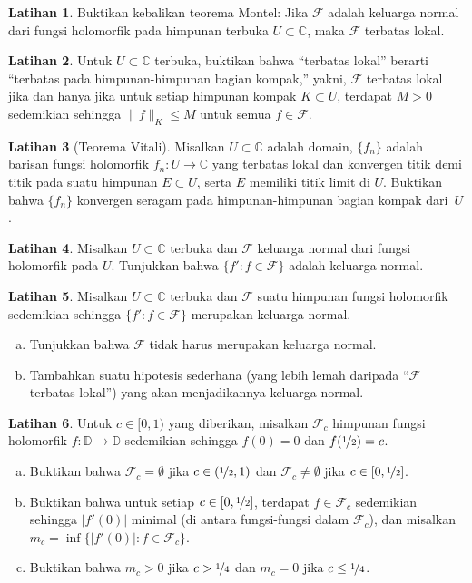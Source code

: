 \documentclass[12pt,openany]{book}
\newcommand{\sabs}[1]{\lvert {#1} \rvert}
\newcommand{\snorm}[1]{\lVert {#1} \rVert}
\newcommand{\C}{{\mathbb{C}}}
\newcommand{\D}{{\mathbb{D}}}
\newcommand{\sF}{{\mathscr{F}}}
\newcommand{\myquote}[1]{``#1''}
\theoremstyle{plain}
\theoremstyle{remark}
\theoremstyle{definition}
\newenvironment{exbox}{%
    \def\FrameCommand{\vrule width 1pt \relax\hspace{10pt}}%
    \MakeFramed{\advance\hsize-\width\FrameRestore}%
}{%
    \endMakeFramed
}
\newenvironment{exparts}{%
    \leavevmode\begin{enumerate}[a),noitemsep,topsep=0pt,parsep=0pt,partopsep=0pt]
}{%
    \end{enumerate}
}
\theoremstyle{exercise}
\newtheorem{exercise}{Latihan}[section]
\theoremstyle{example}
\begin{document}
\begin{exbox}
\begin{exercise}
Buktikan kebalikan teorema Montel:
Jika $\sF$ adalah keluarga normal dari fungsi holomorfik pada himpunan terbuka $U \subset \C$,
maka $\sF$ terbatas lokal.
\end{exercise}

\begin{exercise}
Untuk $U \subset \C$ terbuka,
buktikan bahwa \myquote{terbatas lokal} berarti
\myquote{terbatas pada himpunan-himpunan bagian kompak,}
yakni, $\sF$ terbatas lokal jika dan hanya jika
untuk setiap himpunan kompak $K \subset U$, terdapat $M >0$ sedemikian sehingga
$\snorm{f}_K \leq M$ untuk semua $f \in \sF$.
\end{exercise}

\begin{exercise}[Teorema Vitali]
Misalkan $U \subset \C$ adalah domain, $\{ f_n \}$ adalah barisan fungsi holomorfik
$f_n \colon U \to \C$ yang terbatas lokal
dan konvergen titik demi titik pada suatu himpunan $E \subset U$,
serta $E$ memiliki titik limit di $U$.  Buktikan bahwa $\{ f_n \}$
konvergen seragam pada himpunan-himpunan bagian kompak dari~$U$.
\end{exercise}

\begin{exercise}
Misalkan $U \subset \C$ terbuka dan $\sF$ keluarga normal dari
fungsi holomorfik pada $U$.
Tunjukkan bahwa $\{ f' : f \in \sF \}$ adalah keluarga normal.
\end{exercise}

\begin{exercise}
Misalkan $U \subset \C$ terbuka dan $\sF$ suatu himpunan fungsi holomorfik
sedemikian sehingga $\{ f' : f \in \sF \}$ merupakan keluarga normal.
\begin{exparts}
\item
Tunjukkan bahwa $\sF$ tidak harus merupakan keluarga normal.
\item
Tambahkan suatu
hipotesis sederhana (yang lebih lemah daripada \myquote{$\sF$ terbatas lokal})
yang akan menjadikannya keluarga normal.
\end{exparts}
\end{exercise}

\begin{exercise}
Untuk $c \in [0,1)$ yang diberikan, misalkan $\sF_c$ himpunan fungsi holomorfik
$f \colon \D \to \D$ sedemikian sehingga $f(0) = 0$ dan $f(\nicefrac{1}{2}) = c$.
\begin{exparts}
\item
Buktikan bahwa
$\sF_c = \emptyset$ jika $c \in (\nicefrac{1}{2},1)$
dan
$\sF_c \neq \emptyset$ jika $c \in [0,\nicefrac{1}{2}]$.
\item
Buktikan bahwa untuk setiap $c \in [0,\nicefrac{1}{2}]$, terdapat
$f \in \sF_c$
sedemikian sehingga $\sabs{f'(0)}$ minimal (di antara fungsi-fungsi dalam $\sF_c$),
dan misalkan $m_c = \inf \bigl\{ \sabs{f'(0)} : f \in \sF_c \bigr\}$.
\item
Buktikan bahwa $m_c > 0$ jika $c > \nicefrac{1}{4}$ dan $m_c = 0$ jika $c \leq \nicefrac{1}{4}$.
\end{exparts}
\end{exercise}


\end{exbox}
\end{document}
